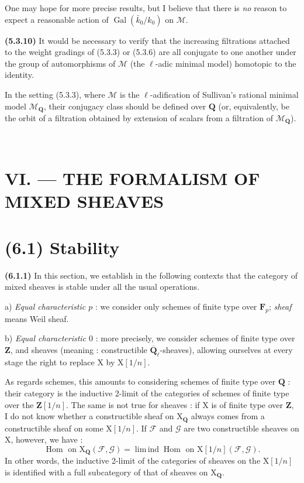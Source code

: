 \documentclass[11pt,leqno]{article}
\newcommand{\Page}[1]{\ifvmode\noindent\else\unskip\ \fi{\footnotesize\textcolor{gray}{[p.\,#1]}}\ \ignorespaces}
\begin{document}
One may hope for more precise results, but I believe that there is
\textit{no} reason to expect a reasonable action of
\(\operatorname{Gal}(\bar{k}_0/k_0)\) on \(\mathscr{M}\).

\textbf{(5.3.10)} It would be necessary to verify that the increasing filtrations
attached to the weight gradings of (5.3.3) or (5.3.6) are
all conjugate to one another under the group of automorphisms of
\(\mathscr{M}\) (the \(\ell\)-adic minimal model) homotopic to the identity.

In the setting (5.3.3), where \(\mathscr{M}\) is the \(\ell\)-adification of
Sullivan’s rational minimal model \(\mathscr{M}_{\mathbf{Q}}\),
their conjugacy class should be defined over \(\mathbf{Q}\)
(or, equivalently, be the orbit of a filtration obtained
by extension of scalars from a filtration of
\(\mathscr{M}_{\mathbf{Q}}\)).

\Page{243}
\section*{VI. — THE FORMALISM OF MIXED SHEAVES}

\section*{(6.1) Stability}

\textbf{(6.1.1)} In this section, we establish in the following
contexts that the category of mixed sheaves is stable under all
the usual operations.

a) \textit{Equal characteristic \(p\)} : we consider only
schemes of finite type over \(\mathbf{F}_p\); \textit{sheaf} means
Weil sheaf.

b) \textit{Equal characteristic \(0\)} : more precisely, we consider
schemes of finite type over \(\mathbf{Z}\), and
sheaves (meaning : constructible \(\overline{\mathbf{Q}}_\ell\)-sheaves),
allowing ourselves at every stage the right to replace
\(\mathrm{X}\) by \(\mathrm{X}[1/n]\).

As regards schemes, this amounts to considering schemes
of finite type over \(\mathbf{Q}\) : their category is the inductive
2-limit of the categories of schemes of finite type over the
\(\mathbf{Z}[1/n]\). The same is not true for sheaves :
if \(\mathrm{X}\) is of finite type over \(\mathbf{Z}\), I do not know whether a
constructible sheaf on \(\mathrm{X}_{\mathbf{Q}}\) always comes
from a constructible sheaf on some \(\mathrm{X}[1/n]\). If
\(\mathscr{F}\) and \(\mathscr{G}\) are two constructible sheaves
on \(\mathrm{X}\), however, we have :
\[
\operatorname{Hom}\text{ on }\mathrm{X}_{\mathbf{Q}}(\mathscr{F},\mathscr{G})
=\operatorname{lim\,ind}\operatorname{Hom}\text{ on }
\mathrm{X}[1/n](\mathscr{F},\mathscr{G}).
\]
In other words, the inductive 2-limit of the categories of sheaves
on the \(\mathrm{X}[1/n]\) is identified with a full subcategory
of that of sheaves on \(\mathrm{X}_{\mathbf{Q}}\).
\end{document}
